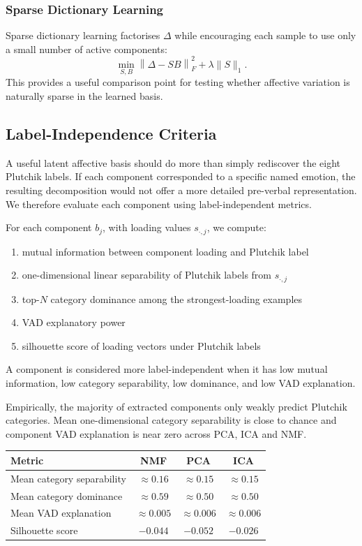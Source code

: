 \documentclass[12pt,twoside]{report}
\begin{document}
\subsubsection{Sparse Dictionary Learning}
Sparse dictionary learning factorises $\Delta$ while encouraging each sample to use only a small number of active components:
\begin{equation}
\min_{S,B}
\left\|
\Delta - SB
\right\|_F^2
+
\lambda \|S\|_1.
\end{equation}
This provides a useful comparison point for testing whether affective variation is naturally sparse in the learned basis.

\subsection{Label-Independence Criteria}
\label{sec:emotion_code:basis:label_independence}

A useful latent affective basis should do more than simply rediscover the eight Plutchik labels. If each component corresponded to a specific named emotion, the resulting decomposition would not offer a more detailed pre-verbal representation. We therefore evaluate each component using label-independent metrics.

For each component $b_j$, with loading values $s_{\cdot,j}$, we compute:

\begin{enumerate}
    \item mutual information between component loading and Plutchik label
    \item one-dimensional linear separability of Plutchik labels from
    $s_{\cdot,j}$
    \item top-$N$ category dominance among the strongest-loading examples
    \item VAD explanatory power
    \item silhouette score of loading vectors under Plutchik labels
\end{enumerate}

A component is considered more label-independent when it has low mutual information, low category separability, low dominance, and low VAD explanation.

Empirically, the majority of extracted components only weakly predict Plutchik categories. Mean one-dimensional category separability is close to chance and component VAD explanation is near zero across PCA, ICA and NMF.
\begin{center}
\begin{tabular}{lccc}
\toprule
Metric & NMF & PCA & ICA \\
\midrule
Mean category separability & $\approx 0.16$ & $\approx 0.15$ & $\approx 0.15$ \\
Mean category dominance & $\approx 0.59$ & $\approx 0.50$ & $\approx 0.50$ \\
Mean VAD explanation & $\approx 0.005$ & $\approx 0.006$ & $\approx 0.006$ \\
Silhouette score & $-0.044$ & $-0.052$ & $-0.026$ \\
\bottomrule
\end{tabular}
\end{center}
\end{document}
